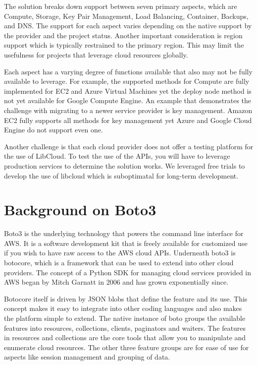 The solution breaks down support between seven primary aspects, which are
Compute, Storage, Key Pair Management, Load Balancing, Container, Backups, and
DNS. The support for each aspect varies depending on the native support by the
provider and the project status. Another important consideration is region
support which is typically restrained to the primary region. This may limit the
usefulness for projects that leverage cloud resources globally.

Each aspect has a varying degree of functions available that also may not be
fully available to leverage. For example, the supported methods for Compute are
fully implemented for EC2 and Azure Virtual Machines yet the deploy node method
is not yet available for Google Compute Engine. An example that demonstrates
the
challenge with migrating to a newer service provider is key management. Amazon
EC2 fully supports all methods for key management yet Azure and Google Cloud
Engine do not support even one.

Another challenge is that each cloud provider does not offer a testing platform
for the use of LibCloud. To test the use of the APIs, you will have to leverage
production services to determine the solution works. We leveraged free trials
to
develop the use of libcloud which is suboptimatal for long-term development.

\section{Background on Boto3}

Boto3 is the underlying technology that powers the command line interface for
AWS. It is a software development kit that is freely available for customized
use if you wish to have raw access to the AWS cloud APIs. Underneath boto3 is
botocore, which is a framework that can be used to extend into other cloud
providers. The concept of a Python SDK for managing cloud services provided in
AWS began by Mitch Garnatt in 2006 and has grown exponentially
since.~\cite{hid-sp18-518-AWS-boto3}

Botocore itself is driven by JSON blobs that define the feature and its use.
This concept makes it easy to integrate into other coding languages and also
makes the platform simple to extend. The native instance of boto groups the
available features into resources, collections, clients, paginators and
waiters.
The features in resources and collections are the core tools that allow you to
manipulate and enumerate cloud resources. The other three feature groups are
for
ease of use for aspects like session management and grouping of
data.~\cite{hid-sp18-518-Boto3}

